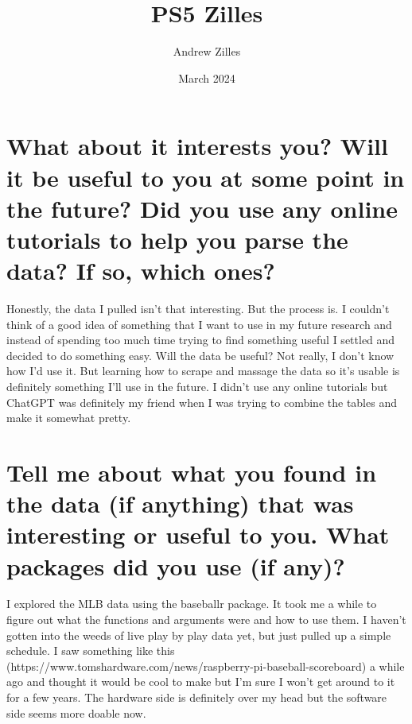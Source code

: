 \documentclass{article}
\title{PS5 Zilles}
\author{Andrew Zilles}
\date{March 2024}
\begin{document}
\maketitle

\section{What about it interests you? Will it be useful to you at some point in the future? Did you use any online tutorials to help you parse the data? If so, which ones?
}
Honestly, the data I pulled isn't that interesting. But the process is. I couldn't think of a good idea of something that I want to use in my future research and instead of spending too much time trying to find something useful I settled and decided to do something easy. Will the data be useful? Not really, I don't know how I'd use it. But learning how to scrape and massage the data so it's usable is definitely something I'll use in the future. I didn't use any online tutorials but ChatGPT was definitely my friend when I was trying to combine the tables and make it somewhat pretty.

\section{Tell me about what you found in the data (if anything) that was interesting or useful to you. What packages did you use (if any)?
}
I explored the MLB data using the baseballr package. It took me a while to figure out what the functions and arguments were and how to use them. I haven't gotten into the weeds of live play by play data yet, but just pulled up a simple schedule. I saw something like this (https://www.tomshardware.com/news/raspberry-pi-baseball-scoreboard) a while ago and thought it would be cool to make but I'm sure I won't get around to it for a few years. The hardware side is definitely over my head but the software side seems more doable now.
\end{document}
